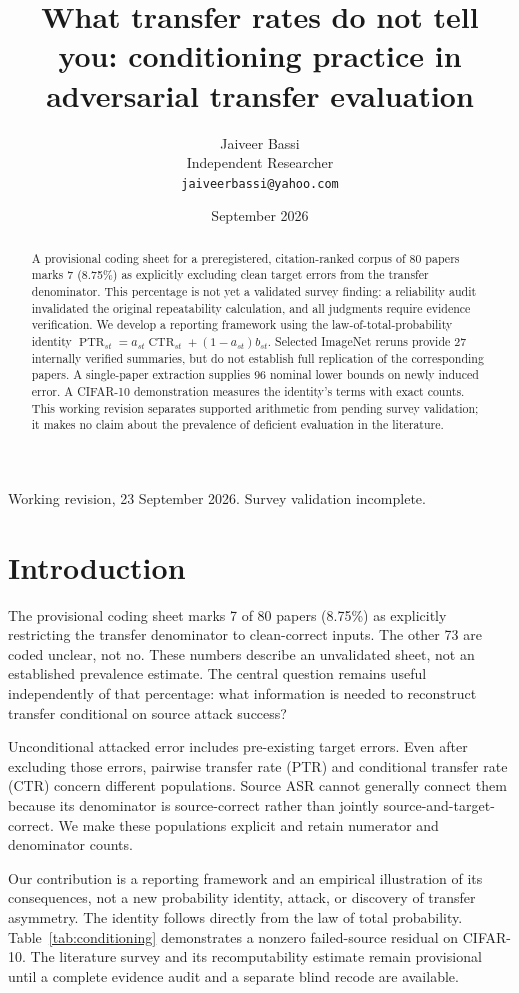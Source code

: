 \documentclass[10pt,twocolumn]{article}
\title{What transfer rates do not tell you: conditioning practice in adversarial transfer evaluation}
\author{Jaiveer Bassi\\Independent Researcher\\\texttt{jaiveerbassi@yahoo.com}}
\date{September 2026}
\begin{document}
\maketitle
\begin{center}\small Working revision, 23 September 2026. Survey validation incomplete.\end{center}
\begin{abstract}
A provisional coding sheet for a preregistered, citation-ranked corpus of 80 papers marks 7 (8.75\%) as explicitly excluding clean target errors from the transfer denominator. This percentage is not yet a validated survey finding: a reliability audit invalidated the original repeatability calculation, and all judgments require evidence verification. We develop a reporting framework using the law-of-total-probability identity $\operatorname{PTR}_{st}=a_{st}\operatorname{CTR}_{st}+(1-a_{st})b_{st}$. Selected ImageNet reruns provide 27 internally verified summaries, but do not establish full replication of the corresponding papers. A single-paper extraction supplies 96 nominal lower bounds on newly induced error. A CIFAR-10 demonstration measures the identity's terms with exact counts. This working revision separates supported arithmetic from pending survey validation; it makes no claim about the prevalence of deficient evaluation in the literature.
\end{abstract}

\section{Introduction}
The provisional coding sheet marks 7 of 80 papers (8.75\%) as explicitly restricting the transfer denominator to clean-correct inputs. The other 73 are coded unclear, not no. These numbers describe an unvalidated sheet, not an established prevalence estimate. The central question remains useful independently of that percentage: what information is needed to reconstruct transfer conditional on source attack success?

Unconditional attacked error includes pre-existing target errors. Even after excluding those errors, pairwise transfer rate (PTR) and conditional transfer rate (CTR) concern different populations. Source ASR cannot generally connect them because its denominator is source-correct rather than jointly source-and-target-correct. We make these populations explicit and retain numerator and denominator counts.

Our contribution is a reporting framework and an empirical illustration of its consequences, not a new probability identity, attack, or discovery of transfer asymmetry. The identity follows directly from the law of total probability. Table~\ref{tab:conditioning} demonstrates a nonzero failed-source residual on CIFAR-10. The literature survey and its recomputability estimate remain provisional until a complete evidence audit and a separate blind recode are available.
\end{document}
